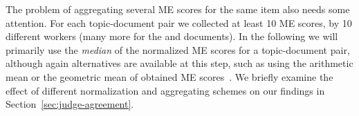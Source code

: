 

The problem of aggregating several ME scores for the same item also
needs some attention. 
For each topic-document pair we collected at least 10 ME scores, by 10
different workers (many more for the \nkn and \hkh documents). 
In the following we will primarily use the \emph{median} of the normalized ME
scores for a topic-document pair, although again alternatives are available at this step,
such as using the arithmetic mean or
the geometric mean of obtained ME scores~\cite{moskowitz:1977}. 
We briefly examine the effect of 
different normalization and aggregating schemes
on our findings in Section~\ref{sec:judge-agreement}.

